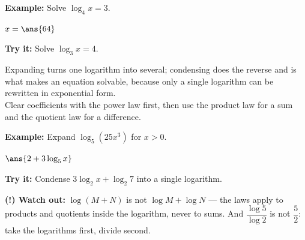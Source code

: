 \documentclass[12pt]{article}
\begin{document}
\begin{examplebox}
\textbf{Example:} Solve $\log_4 x = 3$.

$x = \ans{64}$
\end{examplebox}

\begin{tryitbox}
\textbf{Try it:} Solve $\log_3 x = 4$.\\[2pt]
\end{tryitbox}


\begin{formulabox}
Expanding turns one logarithm into several; condensing does the reverse and is
what makes an equation solvable, because only a single logarithm can be
rewritten in exponential form.\\[3pt]
Clear coefficients with the power law first, then use the product law for a
sum and the quotient law for a difference.
\end{formulabox}

\begin{examplebox}
\textbf{Example:} Expand $\log_5(25x^3)$ for $x > 0$.

$\ans{2 + 3\log_5 x}$
\end{examplebox}

\begin{tryitbox}
\textbf{Try it:} Condense $3\log_2 x + \log_2 7$ into a single logarithm.\\[2pt]
\end{tryitbox}

\begin{watchoutbox}
\textbf{(!) Watch out:} $\log(M + N)$ is not $\log M + \log N$ --- the laws
apply to products and quotients inside the logarithm, never to sums. And
$\dfrac{\log 5}{\log 2}$ is not $\dfrac{5}{2}$: take the logarithms first,
divide second.
\end{watchoutbox}
\end{document}
